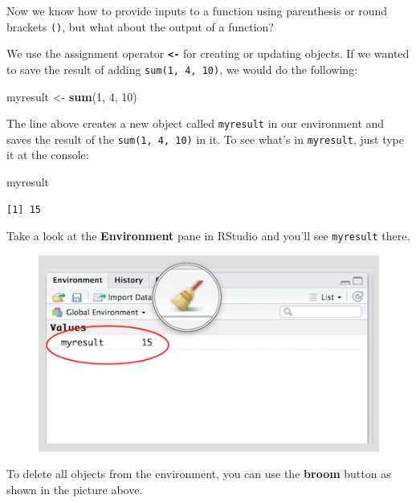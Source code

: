 \documentclass[]{article}
\newenvironment{Shaded}{\begin{snugshade}}{\end{snugshade}}
\newcommand{\KeywordTok}[1]{\textcolor[rgb]{0.13,0.29,0.53}{\textbf{#1}}}
\newcommand{\DecValTok}[1]{\textcolor[rgb]{0.00,0.00,0.81}{#1}}
\newcommand{\StringTok}[1]{\textcolor[rgb]{0.31,0.60,0.02}{#1}}
\newcommand{\NormalTok}[1]{#1}
\theoremstyle{definition}
\theoremstyle{definition}
\theoremstyle{definition}
\theoremstyle{remark}
\begin{document}
Now we know how to provide inputs to a function using parenthesis or
round brackets \texttt{()}, but what about the output of a function?

We use the assignment operator \textbf{\texttt{\textless{}-}} for
creating or updating objects. If we wanted to save the result of adding
\texttt{sum(1,\ 4,\ 10)}, we would do the following:

\begin{Shaded}
\begin{Highlighting}[]
\NormalTok{myresult <-}\StringTok{ }\KeywordTok{sum}\NormalTok{(}\DecValTok{1}\NormalTok{, }\DecValTok{4}\NormalTok{, }\DecValTok{10}\NormalTok{)}
\end{Highlighting}
\end{Shaded}

The line above creates a new object called \texttt{myresult} in our
environment and saves the result of the \texttt{sum(1,\ 4,\ 10)} in it.
To see what's in \texttt{myresult}, just type it at the console:

\begin{Shaded}
\begin{Highlighting}[]
\NormalTok{myresult}
\end{Highlighting}
\end{Shaded}

\begin{verbatim}
[1] 15
\end{verbatim}

Take a look at the \textbf{Environment} pane in RStudio and you'll see
\texttt{myresult} there.

\begin{figure}
\centering
\includegraphics{./img/rstudio_env.png}
\caption{}
\end{figure}

To delete all objects from the environment, you can use the
\textbf{broom} button as shown in the picture above.
\end{document}
